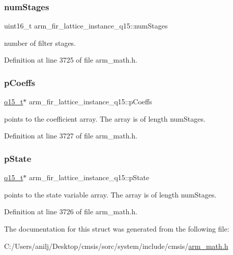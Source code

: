 \subsubsection{\texorpdfstring{num\+Stages}{numStages}}
{\footnotesize\ttfamily uint16\+\_\+t arm\+\_\+fir\+\_\+lattice\+\_\+instance\+\_\+q15\+::num\+Stages}

number of filter stages. 

Definition at line 3725 of file arm\+\_\+math.\+h.

\mbox{\label{structarm__fir__lattice__instance__q15_a78f872826140069cf67836fff87360bc}} 
\subsubsection{\texorpdfstring{p\+Coeffs}{pCoeffs}}
{\footnotesize\ttfamily \hyperlink{arm__math_8h_ab5a8fb21a5b3b983d5f54f31614052ea}{q15\+\_\+t}$\ast$ arm\+\_\+fir\+\_\+lattice\+\_\+instance\+\_\+q15\+::p\+Coeffs}

points to the coefficient array. The array is of length num\+Stages. 

Definition at line 3727 of file arm\+\_\+math.\+h.

\mbox{\label{structarm__fir__lattice__instance__q15_a37b90dea2bc3ee7c9951a9fe74db0cbb}} 
\subsubsection{\texorpdfstring{p\+State}{pState}}
{\footnotesize\ttfamily \hyperlink{arm__math_8h_ab5a8fb21a5b3b983d5f54f31614052ea}{q15\+\_\+t}$\ast$ arm\+\_\+fir\+\_\+lattice\+\_\+instance\+\_\+q15\+::p\+State}

points to the state variable array. The array is of length num\+Stages. 

Definition at line 3726 of file arm\+\_\+math.\+h.



The documentation for this struct was generated from the following file\+:\begin{DoxyCompactItemize}
\item 
C\+:/\+Users/anilj/\+Desktop/cmsis/sorc/system/include/cmsis/\hyperlink{arm__math_8h}{arm\+\_\+math.\+h}\end{DoxyCompactItemize}
